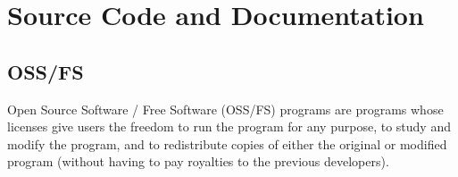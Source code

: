
\section{Source Code and Documentation}


\subsection{OSS/FS}

Open Source Software / Free Software (OSS/FS) programs are programs whose
licenses give users the freedom to run the program for any purpose, to study
and modify the program, and to redistribute copies of either the original or
modified program (without having to pay royalties to the previous
developers)\cite{why-oss-fs}.


